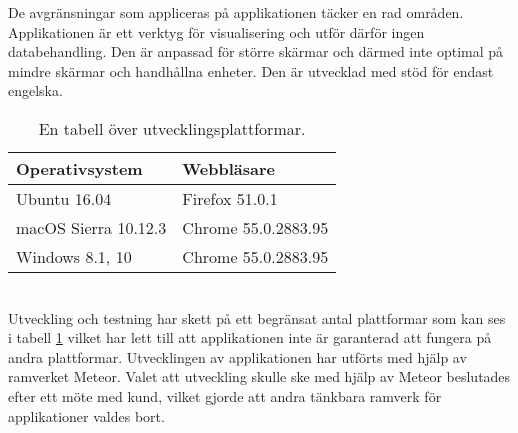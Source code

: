 De avgränsningar som appliceras på applikationen täcker en rad områden. Applikationen är ett verktyg för visualisering och utför därför ingen databehandling. Den är anpassad för större skärmar och därmed inte optimal på mindre skärmar och handhållna enheter. Den är utvecklad med stöd för endast engelska.
\begin{table}[h!]
  \centering
  \caption{En tabell över utvecklingsplattformar.}
  \def\arraystretch{1.5}
  \begin{adjustbox}{max width=\textwidth}
    \begin{tabularx}{\textwidth}{ | l | X | }
      \hline
      \textbf{Operativsystem} & \textbf{Webbläsare} \\
      \hline
      Ubuntu 16.04 & Firefox 51.0.1 \\
      \hline
      macOS Sierra 10.12.3 & Chrome 55.0.2883.95 \\
      \hline
      Windows 8.1, 10 & Chrome 55.0.2883.95 \\
      \hline
    \end{tabularx}
  \end{adjustbox}
  \label{tab:utvecklingsplattformar}
\end{table}
\ \\
Utveckling och testning har skett på ett begränsat antal plattformar som kan ses i tabell \ref{tab:utvecklingsplattformar} vilket har lett till att applikationen inte är garanterad att fungera på andra plattformar. Utvecklingen av applikationen har utförts med hjälp av ramverket Meteor. Valet att utveckling skulle ske med hjälp av Meteor beslutades efter ett möte med kund, vilket gjorde att andra tänkbara ramverk för applikationer valdes bort.

